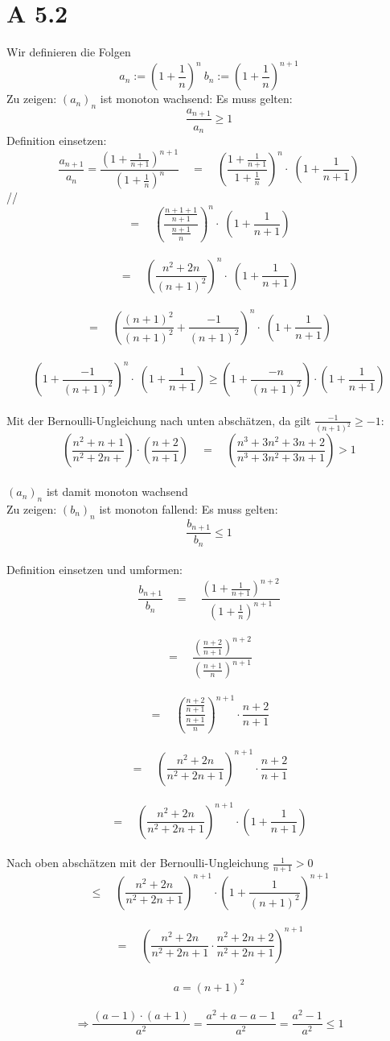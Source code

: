 \documentclass{article}
\begin{document}
    \section*{A 5.2}
    Wir definieren die Folgen
    \[ a_n := { \left( 1 + \frac{1}{n} \right) }^n \ b_n := { \left( 1 + \frac{1}{n} \right) }^{n+1} \]
    Zu zeigen: \( {(a_n)}_n \) ist monoton wachsend:
    Es muss gelten:
    \[ \frac{ a_{n+1} }{ a_n } \geq 1 \]
    Definition einsetzen:
    \[ \frac{ a_{n+1} }{ a_n  }  = \frac{\left(1+\frac{1}{n+1}\right)^{n+1}}{\left(1+\frac{1}{n}\right)^n}  \quad = \quad \left(\frac{1+\frac{1}{n+1}}{1+\frac{1}{n}}\right)^n \cdot \; \left(1+\frac{1}{n+1}\right) \]//
    \[ = \quad \left(\frac{\frac{n+1+1}{n+1}}{\frac{n+1}{n}}\right)^n \cdot  \; \left(1+\frac{1}{n+1}\right) \]\\
    \[ = \quad \left( \frac{n^2 + 2n}{\left(n+1\right)^2}\right)^n \cdot  \; \left(1+\frac{1}{n+1}\right)  \]\\
    \[ = \quad \left(\frac{(n+1)^2}{(n+1)^2}+\frac{-1}{(n+1)^2}\right)^n \cdot  \; \left(1+\frac{1}{n+1}\right) \]\\
    
    \[\left(1+\frac{-1}{(n+1)^2}\right)^n  \cdot  \; \left(1+\frac{1}{n+1}\right) \geq \left(1+\frac{-n}{(n+1)^2}\right)\cdot\left(1+\frac{1}{n+1}\right)      \]\\
    Mit der Bernoulli-Ungleichung nach unten abschätzen, da gilt \( \frac{-1}{ {(n+1)}^2 } \geq -1 \):
    \[ \left(\frac{n^2 +n+1}{n^2+2n+}\right)\cdot\left(\frac{n+2}{n+1}\right) \quad = \quad \left(\frac{n^3 + 3n^2 +3n+2}{n^3+3n^2+3n+1}  \right) > 1    \]\\
    
    \( {(a_n)}_n \) ist damit monoton wachsend \\

    Zu zeigen: \( {(b_n)}_n \) ist monoton fallend:
    Es muss gelten:
    \[ \frac{ b_{n+1} }{ b_{n} } \leq 1 \]\\
    Definition einsetzen und umformen:
    \[   \frac{ b_{n+1} }{ b_{n} } \quad = \quad \frac{\left(1+\frac{1}{n+1}\right)^{n+2}}{\left(1+\frac{1}{n}\right)^{n+1}}   \]\\
    \[   = \quad \frac{\left(\frac{n+2}{n+1}\right)^{n+2}}{\left(\frac{n+1}{n}\right)^{n+1}}   \]\\
    \[   = \quad \left(\frac{\frac{n+2}{n+1}}{\frac{n+1}{n}}\right)^{n+1} \cdot \frac{n+2}{n+1}   \]\\
    \[   = \quad \left(\frac{n^2+2n}{n^2+2n+1}\right)^{n+1} \cdot \frac{n+2}{n+1}   \]\\
    \[   = \quad \left(\frac{n^2+2n}{n^2+2n+1}\right)^{n+1}  \cdot  \left(1+\frac{1}{n+1}\right) \]\\
    Nach oben abschätzen mit der Bernoulli-Ungleichung \(\frac{1}{n+1} > 0\)
    \[   \leq \quad \left(\frac{n^2+2n}{n^2+2n+1}\right)^{n+1}  \cdot  \left(1+\frac{1}{(n+1)^2}\right)^{n+1} \]\\
    \[  = \quad \left(\frac{n^2+2n}{n^2+2n+1}  \cdot  \frac{n^2+2n+2}{n^2+2n+1}\right)^{n+1} \]\\
    \[ a = (n+1)^2 \]\\
    \[\Rightarrow \frac{(a-1)\cdot (a+1)}{a^2} = \frac{a^2+a-a-1}{a^2} = \frac{a^2 -1}{a^2} \leq 1     \]
    
\end{document}
